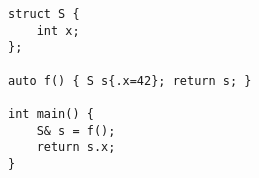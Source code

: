 \begin{lstlisting}[title=\href{https://godbolt.org/z/BPtLIg}{\texttt{godbolt.org/z/BPtLIg}}]
struct S {
    int x;
};

auto f() { S s{.x=42}; return s; }

int main() {
    S& s = f();
    return s.x;
}
\end{lstlisting}
